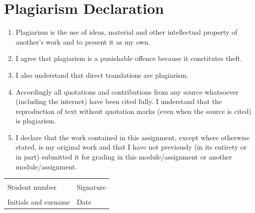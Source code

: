 \chapter*{Plagiarism Declaration}

\begin{enumerate}
    \item Plagiarism is the use of ideas, material and other intellectual property of another's work and to present it as my own.
    
    \item I agree that plagiarism is a punishable offence because it constitutes theft.
    
    \item I also understand that direct translations are plagiarism.
    
    \item Accordingly all quotations and contributions from any source whatsoever (including the internet) have been cited fully. I understand that the reproduction of text without quotation marks (even when the source is cited) is plagiarism.
    
    \item I declare that the work contained in this assignment, except where otherwise stated, is my original work and that I have not previously (in its entirety or in part) submitted it for grading in this module/assignment or another module/assignment.
\end{enumerate}
\noindent
\begin{tabular}{@{}|l|l|@{}}
    \hline
                               &                       \\[4ex]
    Student number\hspace{2cm} & Signature\hspace{2cm} \\
    \hline
                               &                       \\[4ex]
    Initials and surname       & Date                  \\
    \hline
\end{tabular}
